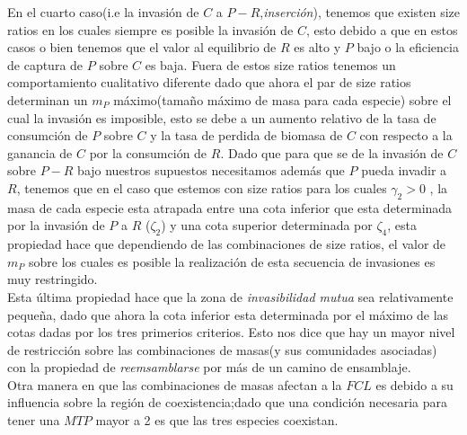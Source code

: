 En el cuarto caso(i.e la invasi\'on de $C$ a $P-R$,\emph{inserci\'on}), tenemos que existen size ratios en los cuales siempre es posible la invasi\'on de $C$, esto debido a que en estos casos o bien tenemos que el valor al equilibrio de $R$ es alto y $P$ bajo o la eficiencia de captura de $P$ sobre $C$ es baja. Fuera de estos size ratios tenemos un comportamiento cualitativo diferente dado que ahora el par de size ratios determinan un $m_P$ m\'aximo(tama\~no m\'aximo de masa para cada especie) sobre el cual la invasi\'on es imposible, esto se debe a un aumento relativo de la tasa de consumci\'on de $P$ sobre $C$ y la tasa de perdida de biomasa de $C$ con respecto a la ganancia de $C$ por la consumci\'on de $R$. Dado que para que se de la invasi\'on de $C$ sobre $P-R$ bajo nuestros supuestos necesitamos adem\'as que $P$ pueda invadir a $R$, tenemos que en el caso que estemos con size ratios para los cuales $\gamma_2 >0$ , la masa de cada especie esta atrapada entre una cota inferior que esta determinada por la invasi\'on de $P$ a $R$ ($\zeta_2$) y una cota superior determinada por $\zeta_4$, esta propiedad hace que dependiendo de las combinaciones de size ratios, el valor de $m_P$ sobre los cuales es posible la realizaci\'on de esta secuencia de invasiones es muy restringido.\\

Esta \'ultima propiedad hace que la zona de \emph{invasibilidad mutua} sea relativamente peque\~na, dado que ahora la cota inferior esta determinada por el m\'aximo de las cotas dadas por los tres primerios criterios. Esto nos dice que hay un mayor nivel de restricci\'on sobre las combinaciones de masas(y sus comunidades asociadas) con la propiedad de \emph{reemsamblarse} por m\'as de un camino de ensamblaje.\\

Otra manera en que las combinaciones de masas afectan a la $FCL$ es debido a su influencia sobre la regi\'on de coexistencia;dado que una condici\'on necesaria para tener una $MTP$ mayor a 2 es que las tres especies coexistan.\\

